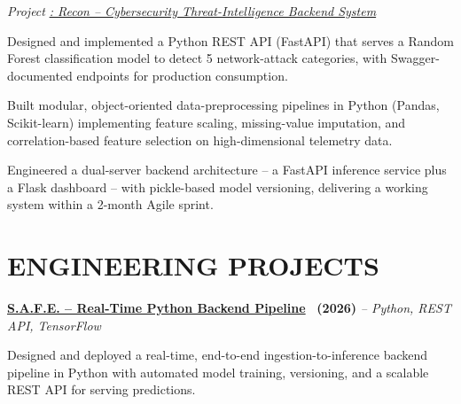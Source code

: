 \documentclass[10pt,letterpaper]{article}
\newcommand{\resumeBullet}[1]{%
    \noindent
    \hspace{4pt}
    {\fontsize{9}{10.3}\selectfont
    \textbullet\hspace{5pt}#1}
    \par
    \vspace{1pt}
}
\begin{document}
\vspace{1.5pt}

{\fontsize{9}{10.3}\selectfont
{\itshape Project}
\href{https://github.com/HelloVishnu04/Recon.git}
{\textcolor{linkblue}{\itshape
: Recon -- Cybersecurity Threat-Intelligence Backend System
}}
}

\vspace{2pt}

\resumeBullet{
Designed and implemented a Python REST API (FastAPI) that serves a Random
Forest classification model to detect 5 network-attack categories, with
Swagger-documented endpoints for production consumption.
}

\resumeBullet{
Built modular, object-oriented data-preprocessing pipelines in Python
(Pandas, Scikit-learn) implementing feature scaling, missing-value
imputation, and correlation-based feature selection on high-dimensional
telemetry data.
}

\resumeBullet{
Engineered a dual-server backend architecture -- a FastAPI inference service
plus a Flask dashboard -- with pickle-based model versioning, delivering a
working system within a 2-month Agile sprint.
}


\section*{ENGINEERING PROJECTS}


\noindent
\href{https://github.com/HelloVishnu04/S.A.F.E.git}
{\textcolor{linkblue}{\textbf{S.A.F.E. -- Real-Time Python Backend Pipeline}}}
{\bfseries\ (2026)}
\hspace{4pt}
{\itshape -- Python, REST API, TensorFlow}

\vspace{2pt}

\resumeBullet{
Designed and deployed a real-time, end-to-end ingestion-to-inference backend
pipeline in Python with automated model training, versioning, and a
scalable REST API for serving predictions.
}

\end{document}
